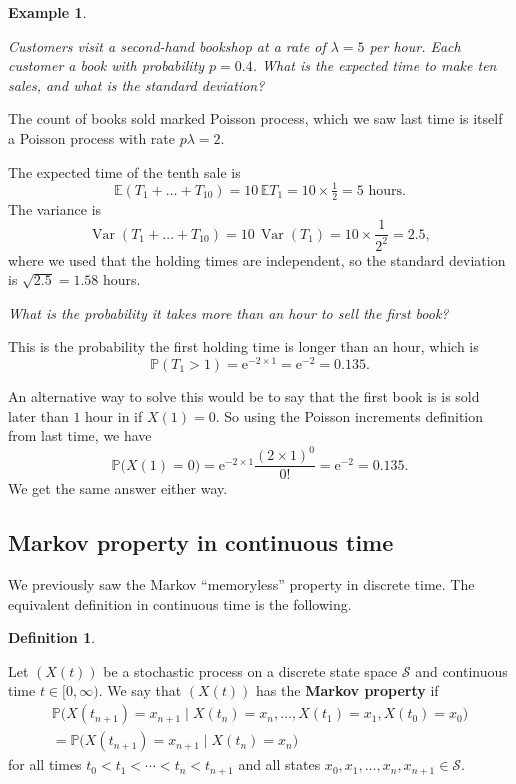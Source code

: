\documentclass[
  a4paper,
]{article}
\theoremstyle{definition}
\newtheorem{definition}{Definition}[section]
\theoremstyle{definition}
\newtheorem{example}{Example}[section]
\theoremstyle{definition}
\theoremstyle{remark}
\begin{document}
\begin{example}
\protect\hypertarget{exm:bookshop}{}\label{exm:bookshop}

\emph{Customers visit a second-hand bookshop at a rate of \(\lambda = 5\) per hour. Each customer a book with probability \(p = 0.4\). What is the expected time to make ten sales, and what is the standard deviation?}

The count of books sold marked Poisson process, which we saw last time is itself a Poisson process with rate \(p\lambda = 2\).

The expected time of the tenth sale is
\[ \mathbb E(T_1 + \dots + T_{10}) = 10\,\mathbb ET_1 = 10 \times \tfrac{1}{2} = 5 \text{ hours} .\]
The variance is
\[ \operatorname{Var}(T_1 + \dots + T_{10}) = 10\,\operatorname{Var}(T_1) = 10 \times \frac{1}{2^2} = 2.5 , \]
where we used that the holding times are independent, so the standard deviation is \(\sqrt{2.5} = 1.58\) hours.

\emph{What is the probability it takes more than an hour to sell the first book?}

This is the probability the first holding time is longer than an hour, which is
\[ \mathbb P(T_1 > 1) = \mathrm{e}^{-2\times 1} = \mathrm{e}^{-2} = 0.135. \]

An alternative way to solve this would be to say that the first book is is sold later than \(1\) hour in if \(X(1) = 0\). So using the Poisson increments definition from last time, we have
\[ \mathbb P\big(X(1) = 0\big) = \mathrm{e}^{-2\times 1} \frac{(2\times 1)^0}{0!}  = \mathrm{e}^{-2} = 0.135. \]
We get the same answer either way.

\end{example}

\hypertarget{cont-markov}{%
\subsection{Markov property in continuous time}\label{cont-markov}}

We previously saw the Markov ``memoryless'' property in discrete time. The equivalent definition in continuous time is the following.

\begin{definition}
\protect\hypertarget{def:pp}{}\label{def:pp}

Let \((X(t))\) be a stochastic process on a discrete state space \(\mathcal S\) and continuous time \(t \in [0,\infty)\). We say that \((X(t))\) has the \textbf{Markov property}
if
\begin{multline*}
\mathbb P\big( X(t_{n+1}) = x_{n+1} \mid X(t_n) = x_n, \dots, X(t_1) = x_1, X(t_0) = x_0 \big) \\
= \mathbb P\big( X(t_{n+1}) = x_{n+1} \mid X(t_n) = x_{n}\big)
\end{multline*}
for all times \(t_0 < t_1 < \cdots < t_n < t_{n+1}\) and all states \(x_0, x_1, \dots, x_n, x_{n+1} \in \mathcal S\).

\end{definition}
\end{document}
